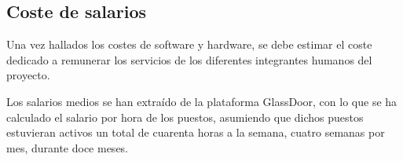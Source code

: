 \begin{table}[H]
    \caption[Presupuesto de software]{Lista de software utilizado con coste. Elaboración propia}
    \end{table}


\subsection{Coste de salarios}

Una vez hallados los costes de software y hardware, se debe estimar el coste dedicado a remunerar los servicios de los diferentes integrantes humanos del proyecto. 

Los salarios medios se han extraído de la plataforma GlassDoor, con lo que se ha calculado el salario por hora de los puestos, asumiendo que dichos puestos estuvieran activos un total de cuarenta horas a la semana, cuatro semanas por mes, durante doce meses. 

